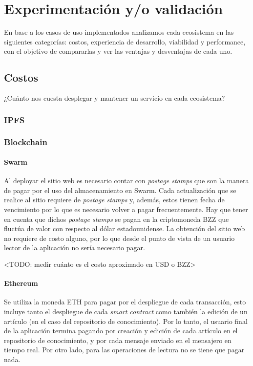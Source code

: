 \section{Experimentación y/o validación}

En base a los casos de uso implementados analizamos cada ecosistema en las siguientes categorías: costos, experiencia de desarrollo, viabilidad y performance, con el objetivo de compararlas y ver las ventajas y desventajas de cada uno.

\subsection{Costos}
¿Cuánto nos cuesta desplegar y mantener un servicio en cada ecosistema?

\subsubsection{IPFS}

\subsubsection{Blockchain}

\paragraph{Swarm}
Al deployar el sitio web es necesario contar con \textit{postage stamps} que son la manera de pagar por el uso del almacenamiento en Swarm. Cada actualización que se realice al sitio requiere de \textit{postage stamps} y, además, estos tienen fecha de vencimiento por lo que es necesario volver a pagar frecuentemente. Hay que tener en cuenta que dichos \textit{postage stamps} se pagan en la criptomoneda BZZ que fluctúa de valor con respecto al dólar estadounidense. La obtención del sitio web no requiere de costo alguno, por lo que desde el punto de vista de un usuario lector de la aplicación no sería necesario pagar.

<TODO: medir cuánto es el costo aproximado en USD o BZZ>

\paragraph{Ethereum}
Se utiliza la moneda ETH para pagar por el despliegue de cada transacción, esto incluye tanto el despliegue de cada \textit{smart contract} como también la edición de un artículo (en el caso del repositorio de conocimiento). Por lo tanto, el usuario final de la aplicación termina pagando por creación y edición de cada artículo en el repositorio de conocimiento, y por cada mensaje enviado en el mensajero en tiempo real. Por otro lado, para las operaciones de lectura no se tiene que pagar nada.

